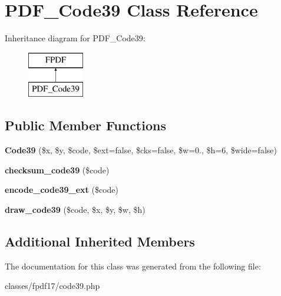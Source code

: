 \hypertarget{classPDF__Code39}{}\section{P\+D\+F\+\_\+\+Code39 Class Reference}
\label{classPDF__Code39}
Inheritance diagram for P\+D\+F\+\_\+\+Code39\+:\begin{figure}[H]
\begin{center}
\leavevmode
\includegraphics[height=2.000000cm]{d1/d2e/classPDF__Code39}
\end{center}
\end{figure}
\subsection*{Public Member Functions}
\begin{DoxyCompactItemize}
\item 
\hypertarget{classPDF__Code39_af4c1115767f937ff6ebd8939a71d1fb7}{}{\bfseries Code39} (\$x, \$y, \$code, \$ext=false, \$cks=false, \$w=0., \$h=6, \$wide=false)\label{classPDF__Code39_af4c1115767f937ff6ebd8939a71d1fb7}

\item 
\hypertarget{classPDF__Code39_a99c09cf64de507faa0e30249a56a9328}{}{\bfseries checksum\+\_\+code39} (\$code)\label{classPDF__Code39_a99c09cf64de507faa0e30249a56a9328}

\item 
\hypertarget{classPDF__Code39_aa66093e56e8d54245f870a4a4251ada9}{}{\bfseries encode\+\_\+code39\+\_\+ext} (\$code)\label{classPDF__Code39_aa66093e56e8d54245f870a4a4251ada9}

\item 
\hypertarget{classPDF__Code39_af7e330f3447f390286885bcbab24af42}{}{\bfseries draw\+\_\+code39} (\$code, \$x, \$y, \$w, \$h)\label{classPDF__Code39_af7e330f3447f390286885bcbab24af42}

\end{DoxyCompactItemize}
\subsection*{Additional Inherited Members}


The documentation for this class was generated from the following file\+:\begin{DoxyCompactItemize}
\item 
classes/fpdf17/code39.\+php\end{DoxyCompactItemize}

